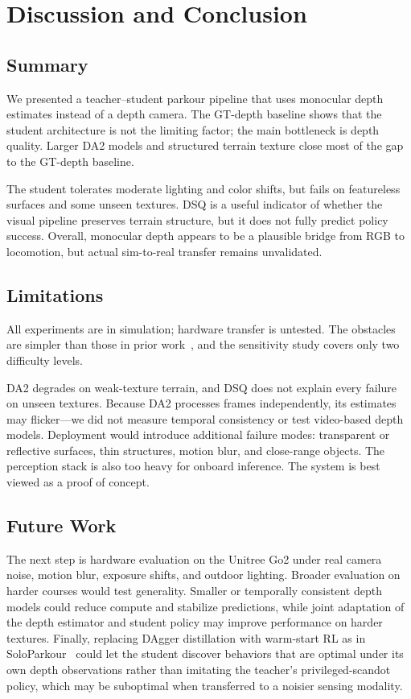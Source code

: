 \section{Discussion and Conclusion}
\label{sec:conclusion}

\subsection{Summary}

We presented a teacher--student parkour pipeline that uses monocular
depth estimates instead of a depth camera.  The GT-depth baseline
shows that the student architecture is not the limiting factor; the
main bottleneck is depth quality.  Larger DA2 models and structured
terrain texture close most of the gap to the GT-depth baseline.

The student tolerates moderate lighting and color shifts, but fails on
featureless surfaces and some unseen textures.
DSQ is a useful indicator of whether the visual pipeline preserves
terrain structure, but it does not fully predict policy success.
Overall, monocular depth appears to be a plausible bridge from RGB to
locomotion, but actual sim-to-real transfer remains unvalidated.

\subsection{Limitations}

All experiments are in simulation; hardware transfer is untested.
The obstacles are simpler than those in prior
work~\citep{cheng2023parkour, zhuang2023robot}, and the sensitivity
study covers only two difficulty levels.

DA2 degrades on weak-texture terrain, and DSQ does not explain every
failure on unseen textures.  Because DA2 processes frames
independently, its estimates may flicker---we did not measure
temporal consistency or test video-based depth models.  Deployment
would introduce additional failure modes: transparent or reflective
surfaces, thin structures, motion blur, and close-range objects.
The perception stack is also too heavy for onboard inference.  The
system is best viewed as a proof of concept.

\subsection{Future Work}

The next step is hardware evaluation on the Unitree Go2 under real
camera noise, motion blur, exposure shifts, and outdoor lighting.
Broader evaluation on harder courses would test generality.  Smaller
or temporally consistent depth models could reduce compute and
stabilize predictions, while joint adaptation of the depth estimator
and student policy may improve performance on harder textures.
Finally, replacing DAgger distillation with warm-start RL as in
SoloParkour~\citep{chane2025soloparkour} could let the student
discover behaviors that are optimal under its own depth observations
rather than imitating the teacher's privileged-scandot policy, which
may be suboptimal when transferred to a noisier sensing modality.
